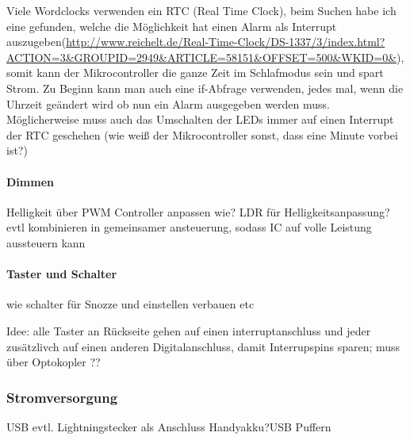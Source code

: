\documentclass[11pt,a4paper,ngerman]{article}
\begin{document}
Viele Wordclocks verwenden ein RTC (Real Time Clock), beim Suchen habe ich eine gefunden, welche die Möglichkeit hat einen Alarm als Interrupt auszugeben(\url{http://www.reichelt.de/Real-Time-Clock/DS-1337/3/index.html?ACTION=3&GROUPID=2949&ARTICLE=58151&OFFSET=500&WKID=0&}), somit kann der Mikrocontroller die ganze Zeit im Schlafmodus sein und spart Strom. Zu Beginn kann man auch eine if-Abfrage verwenden, jedes mal, wenn die Uhrzeit geändert wird ob nun ein Alarm ausgegeben werden muss. Möglicherweise muss auch das Umschalten der LEDs immer auf einen Interrupt der RTC geschehen (wie weiß der Mikrocontroller sonst, dass eine Minute vorbei ist?)


\paragraph{Dimmen}

Helligkeit über PWM Controller anpassen wie?
LDR für Helligkeitsanpassung? evtl kombinieren in gemeinsamer ansteuerung, sodass IC auf volle Leistung aussteuern kann


\paragraph{Taster und Schalter}

wie schalter für Snozze und einstellen verbauen etc

Idee: alle Taster an Rückseite gehen auf einen interruptanschluss und jeder zusätzlivch auf einen anderen Digitalanschluss, damit Interrupspins sparen; muss über Optokopler ??
\subsubsection{Stromversorgung}
USB evtl. Lightningstecker als Anschluss       
Handyakku?USB Puffern\cite{RTCDatenblatt}


\end{document}
